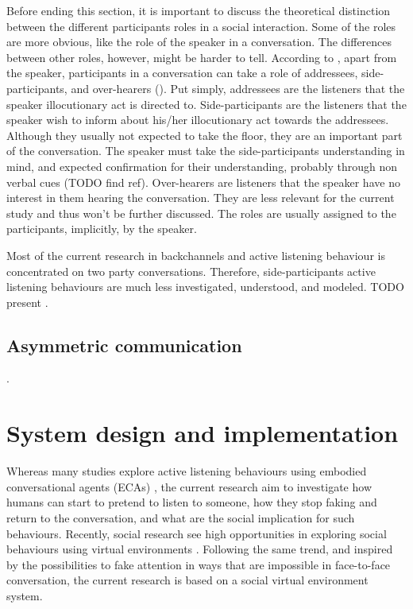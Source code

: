 \documentclass[]{simple-thesis}
\begin{document}

Before ending this section, it is important to discuss the theoretical distinction between the different participants roles in a social interaction.
Some of the roles are more obvious, like the role of the speaker in a conversation.
The differences between other roles, however, might be harder to tell.
According to \citeauthor{Clark1982}, apart from the speaker, participants in a conversation can take a role of addressees, side-participants, and over-hearers (\citeyear{Clark1982}).
Put simply, addressees are the listeners that the speaker illocutionary act is directed to.
Side-participants are the listeners that the speaker wish to inform about his/her illocutionary act towards the addressees.
Although they usually not expected to take the floor, they are an important part of the conversation.
The speaker must take the side-participants understanding in mind, and expected confirmation for their understanding, probably through non verbal cues (TODO find ref).
Over-hearers are listeners that the speaker have no interest in them hearing the conversation.
They are less relevant for the current study and thus won't be further discussed.
The roles are usually assigned to the participants, implicitly, by the speaker.

Most of the current research in backchannels and active listening behaviour is concentrated on two party conversations.
Therefore, side-participants active listening behaviours are much less investigated, understood, and modeled.
TODO present \citep{Matsusaka2003, Fujie2009}.

\section{Asymmetric communication}

\citep{Chou2016, Yee2007, Dominguez2014}.


\chapter{System design and implementation}\label{system_design_and_implementation}

Whereas many studies explore active listening behaviours using embodied conversational agents (ECAs) \citep{Nishimura2007, Bevacqua2008, Gratch2007, Huang2011, Lee2006, Poppe2013}, the current research aim to investigate how humans can start to pretend to listen to someone, how they stop faking and return to the conversation, and what are the social implication for such behaviours.
Recently, social research see high opportunities in exploring social behaviours using virtual environments \citep{Bailenson2008}.
Following the same trend, and inspired by the possibilities to fake attention in ways that are impossible in face-to-face conversation, the current research is based on a social virtual environment system.
\end{document}
